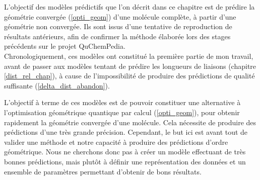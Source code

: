 \par L'objectif des modèles prédictifs que l'on décrit dans ce chapitre est de prédire la géométrie convergée (\ref{opti_geom}) d'une molécule complète, à partir d'une géométrie non convergée. Ils sont issus d'une tentative de reproduction de résultats antérieurs, afin de confirmer la méthode élaborée lors des stages précédents sur le projet QuChemPedia.\\
Chronologiquement, ces modèles ont constitué la première partie de mon travail, avant de passer aux modèles tentant de prédire les longueurs de liaisons (chapitre \ref{dist_rel_chap}), à cause de l'impossibilité de produire des prédictions de qualité suffisante (\ref{delta_dist_abandon}).\\

\par L'objectif à terme de ces modèles est de pouvoir constituer une alternative à l'optimisation géométrique quantique par calcul (\ref{opti_geom}), pour obtenir rapidement la géométrie convergée d'une molécule. Cela nécessite de produire des prédictions d'une très grande précision. Cependant, le but ici est avant tout de valider une méthode et notre capacité à produire des prédictions d'ordre géométrique. Nous ne cherchons donc pas à créer un modèle effectuant de très bonnes prédictions, mais plutôt à définir une représentation des données et un ensemble de paramètres permettant d'obtenir de bons résultats.